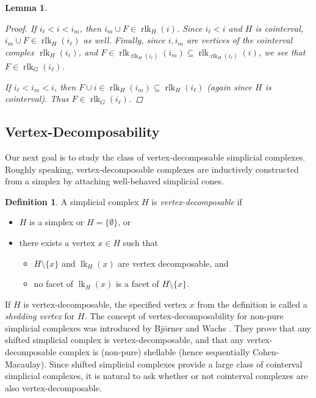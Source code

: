 \documentclass[11pt]{amsart}
\newtheorem{lemma}[theorem]{Lemma}
\theoremstyle{definition}
\newtheorem{definition}[theorem]{Definition}
\numberwithin{equation}{section}
\theoremstyle{remark}
\numberwithin{equation}{section}
\begin{document}
\begin{lemma}
\begin{proof}
If $i_{\ell} < i < i_m$, then ${i_m} \cup F \in \operatorname{rlk}_H(i)$.  Since $i_{\ell}<i$ and $H$ is cointerval, ${i_m} \cup F \in \operatorname{rlk}_{H}(i_{\ell})$ as well.  Finally, since $i,i_m$ are vertices of the cointerval complex $\operatorname{rlk}_H(i_{\ell})$, and $F \in \operatorname{rlk}_{\operatorname{rlk}_H(i_{\ell})}(i_m) \subseteq \operatorname{rlk}_{\operatorname{rlk}_H(i_{\ell})}(i)$, we see that $F \in \operatorname{rlk}_{G}(i_{\ell})$. 

If $i_{\ell}<i_m<i$, then $F \cup i \in \operatorname{rlk}_H(i_m) \subseteq \operatorname{rlk}_H(i_{\ell})$ (again since $H$ is cointerval).  Thus $F \in \operatorname{rlk}_G(i_{\ell})$. 
\end{proof}
\end{lemma}

\subsection{Vertex-Decomposability}

Our next goal is to study the class of vertex-decomposable simplicial complexes.  Roughly speaking, vertex-decomposable complexes are inductively constructed from a simplex by attaching well-behaved simplicial cones. 

\begin{definition}
A simplicial complex $H$ is \textit{vertex-decomposable} if 
\begin{itemize}
\item $H$ is a simplex or $H = \{\emptyset\}$, or 
\item there exists a vertex $x \in H$ such that 
\begin{itemize}
\item $H \setminus \{x\}$ and $\operatorname{lk}_{H}(x)$ are vertex decomposable, and 
\item no facet of $\operatorname{lk}_{H}(x)$ is a facet of $H \setminus \{x\}$. 
\end{itemize}
\end{itemize}
\end{definition}

If $H$ is vertex-decomposable, the specified vertex $x$ from the definition is called a \textit{shedding vertex} for $H$.  The concept of vertex-decomposability for non-pure simplicial complexes was introduced by Bj\"orner and Wachs \cite{BjornerWachsI, BjornerWachsII}.  They prove that any shifted simplicial complex is vertex-decomposable, and that any vertex-decomposable complex is (non-pure) shellable (hence sequentially Cohen-Macaulay).  Since shifted simplicial complexes provide a large class  of cointerval simplicial complexes, it is natural to ask whether or not cointerval complexes are also vertex-decomposable.  
\end{document}
